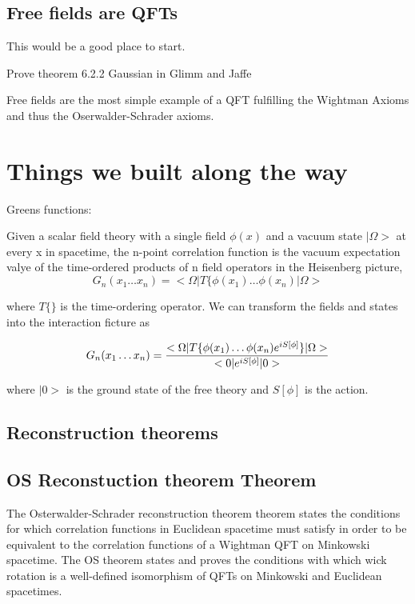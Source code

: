 \documentclass{article}
\newcommand{\1}{\mathbbm{1}}
\theoremstyle{plain}
\theoremstyle{definition}
\numberwithin{equation}{section}
\begin{document}
\subsection{Free fields are QFTs}

This would be a good place to start.

Prove theorem 6.2.2 Gaussian in Glimm and Jaffe

Free fields are the most simple example of a QFT fulfilling the Wightman Axioms and thus the Oserwalder-Schrader axioms. 

\section{Things we built along the way}

Greens functions:

Given a scalar field theory with a single field $\phi(x) $ and a vacuum state $| \Omega>$ at every x in spacetime, the n-point correlation function is the vacuum expectation valye of the time-ordered products of n field operators in the Heisenberg picture, 
\begin{equation}
    G_n(x_1 \ldots x_n)= < \Omega | T \{ \phi(x_1) \ldots \phi(x_n) | \Omega>
\end{equation}

where $T\{\}$ is the time-ordering operator. We can transform the fields and states into the interaction ficture as 

\begin{equation}
    G_n(x_1 \ldots x_n)={< \Omega|T \{ \phi(x_1) \ldots \phi(x_n) e^{i S[\phi]}
    \} |\Omega> \over <0| e^{i S[\phi]}|0>}
\end{equation}

where $|0>$ is the ground state of the free theory and $S[\phi]$ is the action. 

\subsection{Reconstruction theorems}

\subsection{OS Reconstuction theorem Theorem}\label{OStheorems}

The Osterwalder-Schrader reconstruction theorem  theorem states the conditions for which correlation functions in Euclidean spacetime must satisfy in order to be equivalent to the correlation functions of a Wightman QFT on Minkowski spacetime. The OS theorem states and proves the conditions with which wick rotation is a well-defined isomorphism of QFTs on Minkowski and Euclidean spacetimes. 
\end{document}
